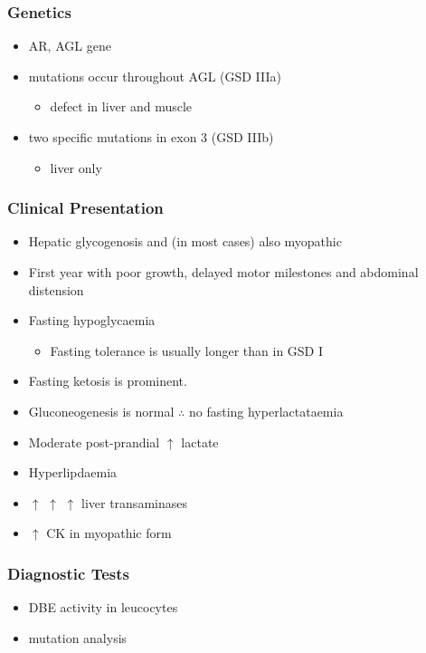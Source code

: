 \documentclass{scrartcl}
\begin{document}
\subsubsection{Genetics}
\label{sec:orgc641550}
\begin{itemize}
\item AR, AGL gene
\item mutations occur throughout AGL (GSD IIIa)
\begin{itemize}
\item defect in liver and muscle
\end{itemize}
\item two specific mutations in exon 3 (GSD IIIb)
\begin{itemize}
\item liver only
\end{itemize}
\end{itemize}
\subsubsection{Clinical Presentation}
\label{sec:org8ee20ea}
\begin{itemize}
\item Hepatic glycogenosis and (in most cases) also myopathic
\item First year with poor growth, delayed motor milestones and abdominal
distension
\item Fasting hypoglycaemia 
\begin{itemize}
\item Fasting tolerance is usually longer than in GSD I
\end{itemize}
\item Fasting ketosis is prominent.
\item Gluconeogenesis is normal \(\therefore\) no fasting hyperlactataemia
\item Moderate post-prandial \(\uparrow\) lactate
\item Hyperlipdaemia
\item \(\uparrow\) \(\uparrow\) \(\uparrow\) liver transaminases
\item \(\uparrow\) CK in myopathic form
\end{itemize}
\subsubsection{Diagnostic Tests}
\label{sec:org36dfffc}
\begin{itemize}
\item DBE activity in leucocytes
\item mutation analysis
\end{itemize}
\end{document}
